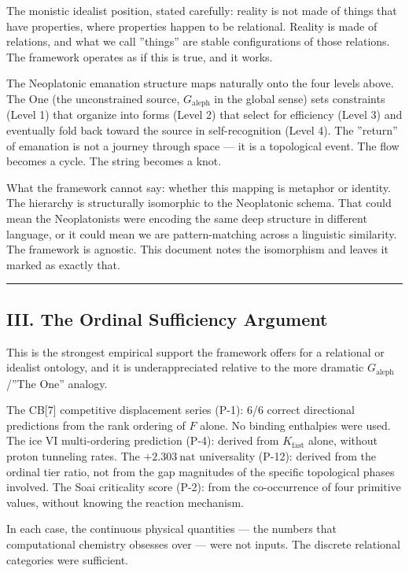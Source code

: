 \documentclass[12pt,a4paper]{article}
\begin{document}
The monistic idealist position, stated carefully: reality is not made of things that have properties, where properties happen to be relational. Reality is made of relations, and what we call ''things'' are stable configurations of those relations. The framework operates as if this is true, and it works.

The Neoplatonic emanation structure maps naturally onto the four levels above. The One (the unconstrained source, $G_\text{aleph}$ in the global sense) sets constraints (Level 1) that organize into forms (Level 2) that select for efficiency (Level 3) and eventually fold back toward the source in self-recognition (Level 4). The ''return'' of emanation is not a journey through space --- it is a topological event. The flow becomes a cycle. The string becomes a knot.

What the framework cannot say: whether this mapping is metaphor or identity. The hierarchy is structurally isomorphic to the Neoplatonic schema. That could mean the Neoplatonists were encoding the same deep structure in different language, or it could mean we are pattern-matching across a linguistic similarity. The framework is agnostic. This document notes the isomorphism and leaves it marked as exactly that.

\begin{center}
\rule{0.5\textwidth}{0.4pt}
\end{center}

\subsection{III. The Ordinal Sufficiency Argument}

This is the strongest empirical support the framework offers for a relational or idealist ontology, and it is underappreciated relative to the more dramatic $G_\text{aleph}$/''The One'' analogy.

The CB{[}7{]} competitive displacement series (P-1): 6/6 correct directional predictions from the rank ordering of $F$ alone. No binding enthalpies were used. The ice VI multi-ordering prediction (P-4): derived from $K_\text{fast}$ alone, without proton tunneling rates. The $+2.303\ \text{nat}$ universality (P-12): derived from the ordinal tier ratio, not from the gap magnitudes of the specific topological phases involved. The Soai criticality score (P-2): from the co-occurrence of four primitive values, without knowing the reaction mechanism.

In each case, the continuous physical quantities --- the numbers that computational chemistry obsesses over --- were not inputs. The discrete relational categories were sufficient.
\end{document}

